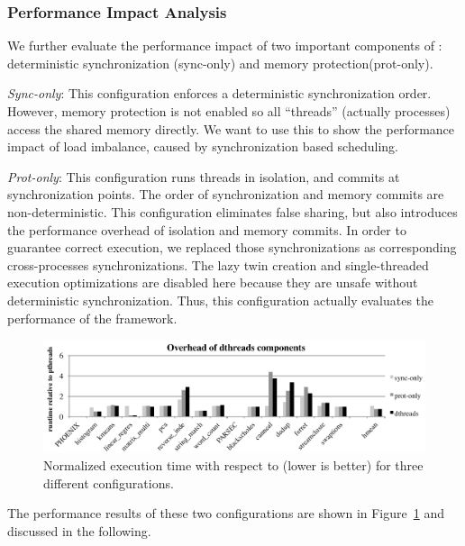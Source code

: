 \subsubsection{Performance Impact Analysis}
We further evaluate the performance impact of two important components of \dthreads: deterministic synchronization (sync-only) and memory protection(prot-only).

\emph{Sync-only}: This configuration enforces a deterministic synchronization order. However, memory protection is not enabled so all ``threads'' (actually processes) access the shared memory directly. We want to use this to show the performance impact of load imbalance, caused by synchronization based scheduling.

\emph{Prot-only}: This configuration runs threads in isolation, and commits at synchronization points. The order of synchronization and memory commits are non-deterministic. This configuration eliminates false sharing, but also introduces the performance overhead of isolation and memory commits. In order to guarantee correct execution, we replaced those synchronizations as corresponding cross-processes synchronizations. The lazy twin creation and single-threaded execution optimizations are disabled here because they are unsafe without deterministic synchronization. Thus, this configuration actually evaluates the performance of the \sheriff{} framework. 


\begin{figure}[!t]
{\centering
\includegraphics[width=6in]{dthreads/figure/perfeffect}
\caption{Normalized execution time with respect to \pthreads{} (lower is better) for three different configurations. 
\label{fig:perfanalysis}}
}
\end{figure}

The performance results of these two configurations are shown in Figure~\ref{fig:perfanalysis} and discussed in the following.

